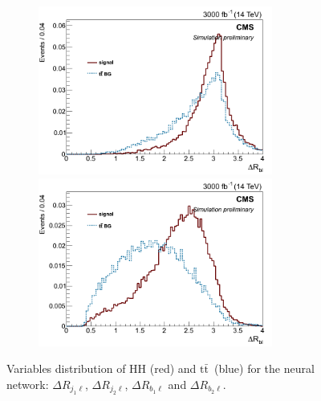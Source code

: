 \documentclass[10pt,a4paper]{article}
\newcommand{\ww}{7.7cm} %
\newcommand{\dd}{-2mm} %
\renewcommand{\tt}{\ensuremath{\text{t}\bar{\text{t}}}}
\begin{document}
\begin{figure}[h]
  \begin{subfigure}[b]{17cm}
    \begin{minipage}[h!]{\ww}
      \centering
      \includegraphics[width=\ww]{figs/DeltaR_b1l.png}
    \end{minipage}
    \begin{minipage}[h!]{\ww}
      \centering
      \includegraphics[width=\ww]{figs/DeltaR_b2l.png}
    \end{minipage}
    \hspace{9mm}
  \end{subfigure}	
  \vspace{\dd}
  \caption{Variables distribution of HH (red) and \tt\ (blue) for the neural network: $\Delta R_{j_1\ell}$, $\Delta R_{j_2\ell}$, $\Delta R_{b_1\ell}$ and $\Delta R_{b_2\ell}$.} \label{vars5} %

\end{figure}
\end{document}
